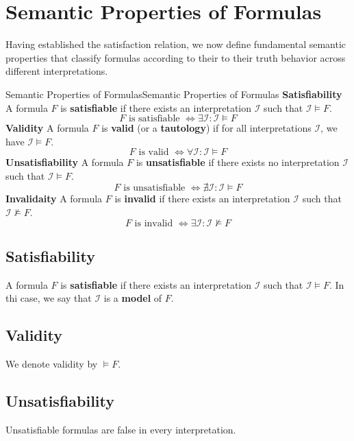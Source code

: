 \documentclass[a4paper]{article}
\theoremstyle{definition}
\begin{document}
\section{Semantic Properties of Formulas}
Having established the satisfaction relation, we now define fundamental semantic properties that classify formulas according 
to their to their truth behavior across different interpretations.
\begin{definition}{Semantic Properties of Formulas}{Semantic Properties of Formulas}
\textbf{Satisfiability}
\newline
A formula \( F \) is \textbf{satisfiable} if there exists an interpretation \( \mathcal{I} \) such that \( \mathcal{I} \models F \).
\[
  F \text{ is satisfiable } \Leftrightarrow \exists \mathcal{I} : \mathcal{I} \models F
\]	
\textbf{Validity}
\newline
A formula \( F \) is \textbf{valid} (or a \textbf{tautology}) if for all interpretations \( \mathcal{I} \), we have \( \mathcal{I} \models F \).
\[
  F \text{ is valid } \Leftrightarrow \forall \mathcal{I} : \mathcal{I} \models F 
\]
\textbf{Unsatisfiability}
\newline
A formula \( F \) is \textbf{unsatisfiable} if there exists no interpretation \( \mathcal{I} \) such that \( \mathcal{I} \models F \).
\[
  F \text{ is unsatisfiable } \Leftrightarrow \nexists \mathcal{I} : \mathcal{I} \models F  
\]
\textbf{Invalidaity}
\newline
A formula \( F \) is \textbf{invalid} if there exists an interpretation \( \mathcal{I} \) such that \( \mathcal{I} \nvDash F \).
\[
  F \text{ is invalid } \Leftrightarrow \exists \mathcal{I} : \mathcal{I} \nvDash F
\]
\end{definition}
\subsection{Satisfiability}
A formula \( F \) is \textbf{satisfiable} if there exists an interpretation \( \mathcal{I} \) such that \( \mathcal{I} \models F \). In thi case, 
we say that \( \mathcal{I} \) is a \textbf{model} of \( F \).
\subsection{Validity}
We denote validity by \( \models F \).
\subsection{Unsatisfiability}
Unsatisfiable formulas are false in every interpretation.
\end{document}
